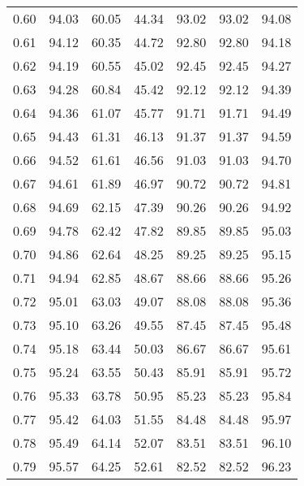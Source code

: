 \begin{tabular}{|c|c|c|c|c|c|c|}
      0.60 &     94.03 &     60.05 &      44.34 &   93.02 &      93.02 &         94.08 \\
      0.61 &     94.12 &     60.35 &      44.72 &   92.80 &      92.80 &         94.18 \\
      0.62 &     94.19 &     60.55 &      45.02 &   92.45 &      92.45 &         94.27 \\
      0.63 &     94.28 &     60.84 &      45.42 &   92.12 &      92.12 &         94.39 \\
      0.64 &     94.36 &     61.07 &      45.77 &   91.71 &      91.71 &         94.49 \\
      0.65 &     94.43 &     61.31 &      46.13 &   91.37 &      91.37 &         94.59 \\
      0.66 &     94.52 &     61.61 &      46.56 &   91.03 &      91.03 &         94.70 \\
      0.67 &     94.61 &     61.89 &      46.97 &   90.72 &      90.72 &         94.81 \\
      0.68 &     94.69 &     62.15 &      47.39 &   90.26 &      90.26 &         94.92 \\
      0.69 &     94.78 &     62.42 &      47.82 &   89.85 &      89.85 &         95.03 \\
      0.70 &     94.86 &     62.64 &      48.25 &   89.25 &      89.25 &         95.15 \\
      0.71 &     94.94 &     62.85 &      48.67 &   88.66 &      88.66 &         95.26 \\
      0.72 &     95.01 &     63.03 &      49.07 &   88.08 &      88.08 &         95.36 \\
      0.73 &     95.10 &     63.26 &      49.55 &   87.45 &      87.45 &         95.48 \\
      0.74 &     95.18 &     63.44 &      50.03 &   86.67 &      86.67 &         95.61 \\
      0.75 &     95.24 &     63.55 &      50.43 &   85.91 &      85.91 &         95.72 \\
      0.76 &     95.33 &     63.78 &      50.95 &   85.23 &      85.23 &         95.84 \\
      0.77 &     95.42 &     64.03 &      51.55 &   84.48 &      84.48 &         95.97 \\
      0.78 &     95.49 &     64.14 &      52.07 &   83.51 &      83.51 &         96.10 \\
      0.79 &     95.57 &     64.25 &      52.61 &   82.52 &      82.52 &         96.23 \\

\end{tabular}
